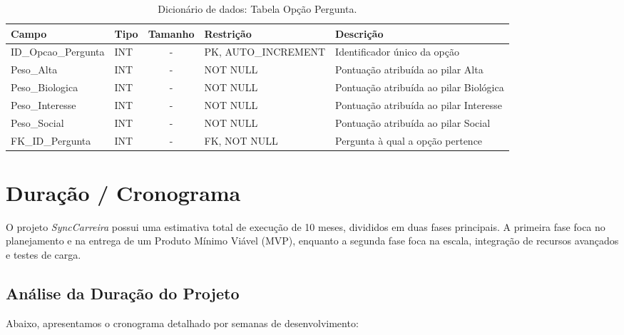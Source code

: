 \begin{table}[H]
    \centering
    \ABNTEXfontereduzida
    \caption[Dicionário de Dados - Tabela Opção Pergunta]{Dicionário de dados: Tabela Opção Pergunta.}
    \label{tab-tb-opcao-pergunta}
    \begin{tabular}{p{3.5cm}|p{2cm}|c|p{3.5cm}|p{4cm}}
    \textbf{Campo} & \textbf{Tipo} & \textbf{Tamanho} & \textbf{Restrição} & \textbf{Descrição} \\
    \hline
    ID\_Opcao\_Pergunta & INT & - & PK, AUTO\_INCREMENT & Identificador único da opção \\
    \hline
    Peso\_Alta & INT & - & NOT NULL & Pontuação atribuída ao pilar Alta \\
    \hline
    Peso\_Biologica & INT & - & NOT NULL & Pontuação atribuída ao pilar Biológica \\
    \hline
    Peso\_Interesse & INT & - & NOT NULL & Pontuação atribuída ao pilar Interesse \\
    \hline
    Peso\_Social & INT & - & NOT NULL & Pontuação atribuída ao pilar Social \\
    \hline
    FK\_ID\_Pergunta & INT & - & FK, NOT NULL & Pergunta à qual a opção pertence \\
    \end{tabular}
\end{table}
\section{Duração / Cronograma}

O projeto \textit{SyncCarreira} possui uma estimativa total de execução de 10 meses, divididos em duas fases principais. A primeira fase foca no planejamento e na entrega de um Produto Mínimo Viável (MVP), enquanto a segunda fase foca na escala, integração de recursos avançados e testes de carga.

\subsection{Análise da Duração do Projeto}

Abaixo, apresentamos o cronograma detalhado por semanas de desenvolvimento:

